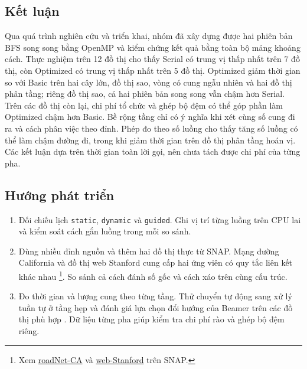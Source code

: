 \subsection{Kết luận}
Qua quá trình nghiên cứu và triển khai, nhóm đã xây dựng được hai phiên bản BFS song song bằng OpenMP và kiểm chứng kết quả bằng toàn bộ mảng khoảng cách. Thực nghiệm trên 12 đồ thị cho thấy Serial có trung vị thấp nhất trên 7 đồ thị, còn Optimized có trung vị thấp nhất trên 5 đồ thị. Optimized giảm thời gian so với Basic trên hai cây lớn, đồ thị sao, vòng có cung ngẫu nhiên và hai đồ thị phân tầng; riêng đồ thị sao, cả hai phiên bản song song vẫn chậm hơn Serial. Trên các đồ thị còn lại, chi phí tổ chức và ghép bộ đệm có thể góp phần làm Optimized chậm hơn Basic. Bề rộng tầng chỉ có ý nghĩa khi xét cùng số cung đi ra và cách phân việc theo đỉnh. Phép đo theo số luồng cho thấy tăng số luồng có thể làm chậm đường đi, trong khi giảm thời gian trên đồ thị phân tầng hoán vị. Các kết luận dựa trên thời gian toàn lời gọi, nên chưa tách được chi phí của từng pha.

\subsection{Hướng phát triển}
\begin{enumerate}
\item Đối chiếu lịch \texttt{static}, \texttt{dynamic} và \texttt{guided}. Ghi vị trí từng luồng trên CPU lai và kiểm soát cách gắn luồng trong mỗi so sánh.
\item Dùng nhiều đỉnh nguồn và thêm hai đồ thị thực từ SNAP. Mạng đường California và đồ thị web Stanford cung cấp hai ứng viên có quy tắc liên kết khác nhau \footnote{Xem \href{https://snap.stanford.edu/data/roadNet-CA.html}{roadNet-CA} và \href{https://snap.stanford.edu/data/web-Stanford.html}{web-Stanford} trên SNAP.}. So sánh cả cách đánh số gốc và cách xáo trên cùng cấu trúc.
\item Đo thời gian và lượng cung theo từng tầng. Thử chuyển tự động sang xử lý tuần tự ở tầng hẹp và đánh giá lựa chọn đổi hướng của Beamer trên các đồ thị phù hợp \cite{beamer2013}. Dữ liệu từng pha giúp kiểm tra chi phí rào và ghép bộ đệm riêng.
\end{enumerate}

